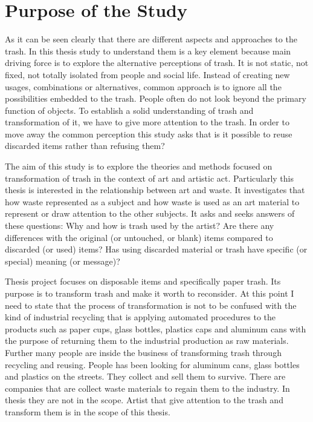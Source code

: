 \section{Purpose of the Study}
As it can be seen clearly that there are different aspects and approaches to the trash. In this thesis study to understand them is a key element because main driving force is to explore the alternative perceptions of trash. It is not static, not fixed, not totally isolated from people and social life. Instead of creating new usages, combinations or alternatives, common approach is to ignore all the possibilities embedded to the trash. People often do not look beyond the primary function of objects. To establish a solid understanding of trash and transformation of it, we have to give more attention to the trash. In order to move away the common perception this study asks that is it possible to reuse discarded items rather than refusing them?

The aim of this study is to explore the theories and methods focused on transformation of trash in the context of art and artistic act. Particularly this thesis is interested in the relationship between art and waste. It investigates that how waste represented as a subject and how waste is used as an art material to represent or draw attention to the other subjects. It asks and seeks answers of these questions: Why and how is trash used by the artist? Are there any differences with the original (or untouched, or blank) items compared to discarded (or used) items? Has using discarded material or trash have specific (or special) meaning (or message)?

Thesis project focuses on disposable items and specifically paper trash. Its purpose is to transform trash and make it worth to reconsider. At this point I need to state that the process of transformation is not to be confused with the kind of industrial recycling that is applying automated procedures to the products such as paper cups, glass bottles, plastics caps and aluminum cans with the purpose of returning them to the industrial production as raw materials. Further many people are inside the business of transforming trash through recycling and reusing. People has been looking for aluminum cans, glass bottles and plastics on the streets. They collect and sell them to survive. There are companies that are collect waste materials to regain them to the industry. In thesis they are not in the scope. Artist that give attention to the trash and transform them is in the scope of this thesis.

